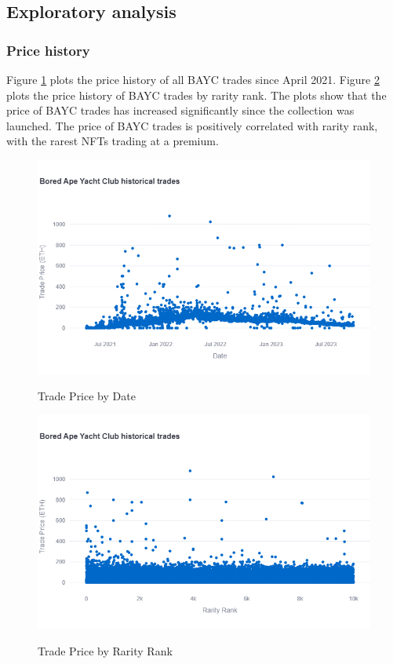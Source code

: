 \documentclass[12pt]{article}
\begin{document}
\subsection{Exploratory analysis}

\subsubsection{Price history}
Figure \ref{fig: price_date} plots the price history of all BAYC trades since April 2021. Figure \ref{fig: price_rarity} plots the price history of BAYC trades by rarity rank. The plots show that the price of BAYC trades has increased significantly since the collection was launched. The price of BAYC trades is positively correlated with rarity rank, with the rarest NFTs trading at a premium.
\begin{figure}[H]
    \caption{Trade Price by Date}
    \includegraphics[width=\textwidth]{../figures/price_date.png}
    \label{fig: price_date}
\end{figure}

\begin{figure}[H]
    \caption{Trade Price by Rarity Rank}
    \includegraphics[width=\textwidth]{../figures/price_rarity.png}
    \label{fig: price_rarity}
\end{figure}
\end{document}
